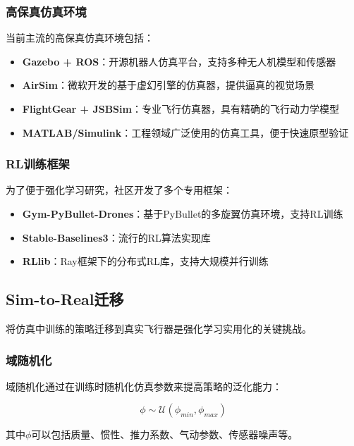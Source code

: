 \documentclass[12pt,a4paper]{ctexart}
\begin{document}
\subsubsection{高保真仿真环境}

当前主流的高保真仿真环境包括：

\begin{itemize}
    \item \textbf{Gazebo + ROS}：开源机器人仿真平台，支持多种无人机模型和传感器
    \item \textbf{AirSim}：微软开发的基于虚幻引擎的仿真器，提供逼真的视觉场景
    \item \textbf{FlightGear + JSBSim}：专业飞行仿真器，具有精确的飞行动力学模型
    \item \textbf{MATLAB/Simulink}：工程领域广泛使用的仿真工具，便于快速原型验证
\end{itemize}

\subsubsection{RL训练框架}

为了便于强化学习研究，社区开发了多个专用框架：

\begin{itemize}
    \item \textbf{Gym-PyBullet-Drones}：基于PyBullet的多旋翼仿真环境，支持RL训练
    \item \textbf{Stable-Baselines3}：流行的RL算法实现库
    \item \textbf{RLlib}：Ray框架下的分布式RL库，支持大规模并行训练
\end{itemize}

\subsection{Sim-to-Real迁移}

将仿真中训练的策略迁移到真实飞行器是强化学习实用化的关键挑战。

\subsubsection{域随机化}

域随机化通过在训练时随机化仿真参数来提高策略的泛化能力：

\begin{equation}
    \phi \sim \mathcal{U}(\phi_{min}, \phi_{max})
\end{equation}

其中$\phi$可以包括质量、惯性、推力系数、气动参数、传感器噪声等。
\end{document}
